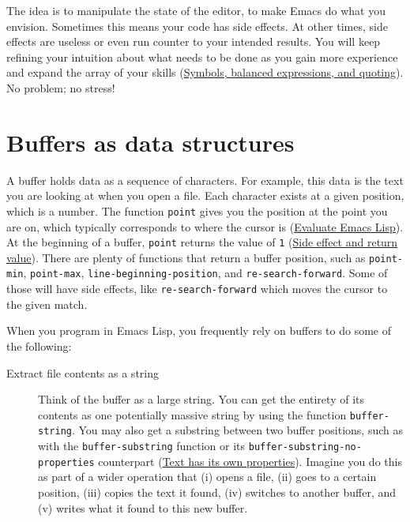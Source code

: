 \documentclass[11pt]{ctexart}
\begin{document}
The idea is to manipulate the state of the editor, to make Emacs do what you envision. Sometimes this means your code has side effects. At other times, side effects are useless or even run counter to your intended results. You will keep refining your intuition about what needs to be done as you gain more experience and expand the array of your skills (\hyperref[sec:org9b7817a]{Symbols, balanced expressions, and quoting}). No problem; no stress!
\section{Buffers as data structures}
\label{sec:org426ce04}
A buffer holds data as a sequence of characters. For example, this data is the text you are looking at when you open a file. Each character exists at a given position, which is a number. The function \texttt{point} gives you the position at the point you are on, which typically corresponds to where the cursor is (\hyperref[sec:org91f7fd8]{Evaluate Emacs Lisp}). At the beginning of a buffer, \texttt{point} returns the value of \texttt{1} (\hyperref[sec:org2689823]{Side effect and return value}). There are plenty of functions that return a buffer position, such as \texttt{point-min}, \texttt{point-max}, \texttt{line-beginning-position}, and \texttt{re-search-forward}. Some of those will have side effects, like \texttt{re-search-forward} which moves the cursor to the given match.

When you program in Emacs Lisp, you frequently rely on buffers to do some of the following:

\begin{description}
\item[{Extract file contents as a string}] Think of the buffer as a large string. You can get the entirety of its contents as one potentially massive string by using the function \texttt{buffer-string}. You may also get a substring between two buffer positions, such as with the \texttt{buffer-substring} function or its \texttt{buffer-substring-no-properties} counterpart (\hyperref[sec:orgcf4e6e5]{Text has its own properties}). Imagine you do this as part of a wider operation that (i) opens a file, (ii) goes to a certain position, (iii) copies the text it found, (iv) switches to another buffer, and (v) writes what it found to this new buffer.
\end{description}
\end{document}
